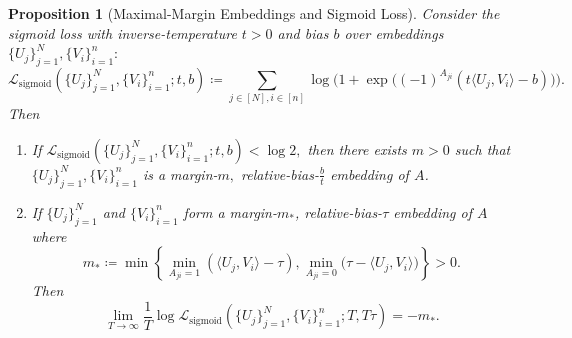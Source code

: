 \documentclass[10pt,a4paper]{amsart}
\newtheorem{proposition}{Proposition}
\newcommand{\sigloss}{\mathcal{L}_{\text{sigmoid}}}
\begin{document}
\begin{proposition}[Maximal-Margin Embeddings and Sigmoid Loss]
\label{prop:marginsigmoid} 
Consider the sigmoid loss with inverse-temperature $t>0$ and bias $b$ over embeddings $\{U_j\}_{j = 1}^N, \{V_i\}_{i = 1}^n:$ 
$$
\sigloss(\{U_j\}_{j = 1}^N, \{V_i\}_{i = 1}^n; t, b)\coloneqq \sum_{j\in [N], i \in [n]} \log\Big(1 + \exp\big((-1)^{A_{ji}}(t\langle U_j, V_i\rangle -b)\big)\Big).
$$
Then
\begin{enumerate}
    \item If $\sigloss(\{U_j\}_{j = 1}^N, \{V_i\}_{i = 1}^n; t, b) < \log 2,$ then there exists $m > 0$ such that $\{U_j\}_{j = 1}^N, \{V_i\}_{i = 1}^n$ is a margin-$m,$ relative-bias-$\frac{b}{t}$ embedding of $A$.
    \item If $\{U_j\}_{j=1}^N$ and $\{V_i\}_{i=1}^n$ form a margin-$m_*$, relative-bias-$\tau$ embedding of $A$ where
$$
m_* \coloneqq \min\left\{
\min_{A_{ji}=1}\left(\langle U_j,V_i\rangle-\tau\right),
\min_{A_{ji}=0}\bigl(\tau-\langle U_j,V_i\rangle\bigr)
\right\} > 0.
$$
Then
$$
\lim_{T\to\infty}\frac{1}{T}\log \sigloss(\{U_j\}_{j=1}^N,\{V_i\}_{i=1}^n;T,T\tau)=-m_*.
$$
\end{enumerate}
\end{proposition}
\end{document}

